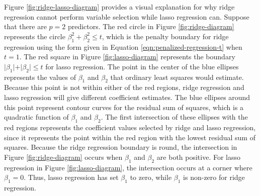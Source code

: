 \documentclass{article}
\begin{document}
Figure \ref{fig:ridge-lasso-diagram} provides a visual explanation for why ridge regression cannot perform variable selection while lasso regression can. Suppose that there are $p = 2$ predictors. The red circle in Figure \ref{fig:ridge-diagram} represents the circle $\beta_1^2 + \beta_2^2 \leq t$, which is the penalty boundary for ridge regression using the form given in Equation \ref{eqn:penalized-regression-t} when $t = 1$. The red square in Figure \ref{fig:lasso-diagram} represents the boundary $\vert \beta_1 \vert + \vert \beta_2 \vert \leq t$ for lasso regression. The point in the center of the blue ellipses represents the values of $\beta_1$ and $\beta_2$ that ordinary least squares would estimate. Because this point is not within either of the red regions, ridge regression and lasso regression will give different coefficient estimates. The blue ellipses around this point represent contour curves for the residual sum of squares, which is a quadratic function of $\beta_1$ and $\beta_2$. The first intersection of these ellipses with the red regions represents the coefficient values selected by ridge and lasso regression, since it represents the point within the red region with the lowest residual sum of squares. Because the ridge regression boundary is round, the intersection in Figure \ref{fig:ridge-diagram} occurs when $\beta_1$ and $\beta_2$ are both positive. For lasso regression in Figure \ref{fig:lasso-diagram}, the intersection occurs at a corner where $\beta_1=0$. Thus, lasso regression has set $\beta_1$ to zero, while $\beta_1$ is non-zero for ridge regression.
\end{document}
